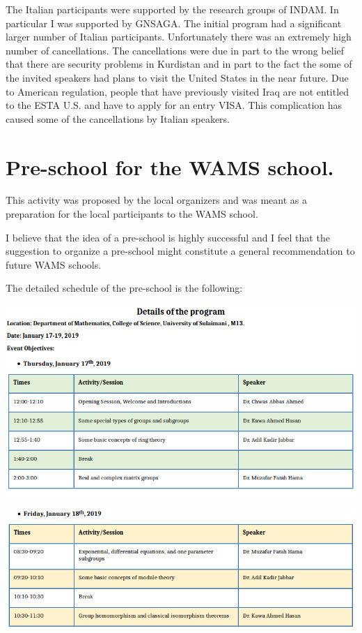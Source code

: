 \documentclass[12pt,a4paper]{scrartcl}
\begin{document}
The Italian participants were supported by the research groups of INDAM. In particular I was supported by GNSAGA. The initial program had a significant larger number of Italian participants. Unfortunately there was an extremely high number of cancellations. The cancellations were due in part to the wrong belief that there are security problems in Kurdistan and in part to the fact the some of the invited speakers had plans to visit the United States in the near future. Due to American regulation, people that have previously visited Iraq are not entitled to the ESTA U.S. and have to apply for an entry VISA. This complication has caused some of the cancellations by Italian speakers.

\section{Pre-school for the WAMS school.}

This activity was proposed by the local organizers and was meant as a preparation for the local participants
to the WAMS school.

I believe that the idea of a pre-school is highly successful and I feel that the suggestion to organize a pre-school might constitute a general recommendation to future WAMS schools.

The detailed schedule of the pre-school is the following:

\centerline{\includegraphics[width=18cm]{prep1.png}}

\centerline{\includegraphics[width=18cm]{prep2.png}}
\end{document}
